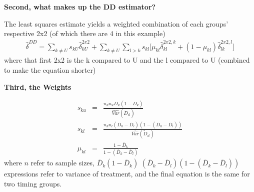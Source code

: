 \documentclass[notes=show]{beamer}
\begin{document}
	

\begin{frame}[plain]
\begin{center}
\textbf{Second, what makes up the DD estimator?}
\end{center}


The least squares estimate yields a weighted combination of each groups' respective 2x2 (of which there are 4 in this example)
\begin{eqnarray*}	
\widehat{\delta}^{DD} = \sum_{k \neq U} s_{kU}\widehat{\delta}_{kU}^{2x2} + \sum_{k \neq U} \sum_{l>k} s_{kl}  \bigg [ \mu_{kl}\widehat{\delta}_{kl}^{2x2,k} + (1-\mu_{kl}) \widehat{\delta}_{lk}^{2x2,l} \bigg]
\end{eqnarray*}where that first 2x2 is the k compared to U and the l compared to U (combined to make the equation shorter)

\end{frame}
	


\begin{frame}[plain]
\begin{center}
\textbf{Third, the Weights}
\end{center}

 \begin{eqnarray*} s_{ku} &=& \frac{ n_k n_u \overline{D}_k (1- \overline{D}_k ) }{ \widehat{Var} ( \tilde{D}_{it} )} \\
s_{kl} &=& \frac{ n_k n_l (\overline{D}_k - \overline{D}_{l} ) ( 1- ( \overline{D}_k - \overline{D}_{l} )) }{\widehat{Var}(\tilde{D}_{it})} \\
\mu_{kl} &=& \frac{1 - \overline{D}_k }{1 - ( \overline{D}_k - \overline{D}_{l} )}
\end{eqnarray*}where $n$ refer to sample sizes, $\overline{D}_k (1- \overline{D}_k )$ $(\overline{D}_k - \overline{D}_{l} ) ( 1- ( \overline{D}_k - \overline{D}_{l} ))$ expressions refer to variance of treatment, and the final equation is the same for two timing groups.

\end{frame}
\end{document}
